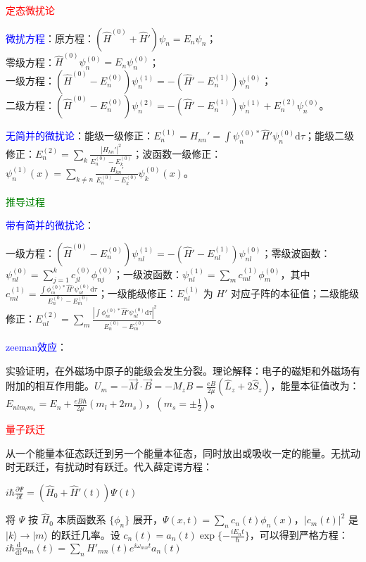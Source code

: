 \documentclass[a4paper,8pt]{extarticle} %
\newcommand{\bluetext}[1]{\textcolor{blue}{#1}}
\newcommand{\redtext}[1]{\textcolor{red}{#1}}
\newcommand{\greentext}[1]{\textcolor{green}{#1}}
\begin{document}
\begin{multicols}{3}

\redtext{定态微扰论}

\bluetext{微扰方程}：原方程：$(\hat{H}^{(0)} + \hat{H}')\psi_n = E_n\psi_n$；\\
零级方程：$\hat{H}^{(0)}\psi_n^{(0)} = E_n\psi_n^{(0)}$；\\
一级方程：$(\hat{H}^{(0)} - E_n^{(0)})\psi_n^{(1)} = -(\hat{H}' - E_n^{(1)})\psi_n^{(0)}$；\\
二级方程：$(\hat{H}^{(0)} - E_n^{(0)})\psi_n^{(2)} = -(\hat{H}' - E_n^{(1)})\psi_n^{(1)} + E_n^{(2)}\psi_n^{(0)}$。

\bluetext{无简并的微扰论}：能级一级修正：$E_n^{(1)} = H_{nn}' = \int \psi_n^{(0)*} \hat{H}'\psi_n^{(0)} \mathrm{d}\tau$；能级二级修正：$E_n^{(2)} = \sum_k \frac{|H_{kn}'|^2}{E_n^{(0)}-E_k^{(0)}}$；波函数一级修正：$\psi_n^{(1)}(x) = \sum_{k\neq n} \frac{H_{kn}'}{E_n^{(0)}-E_k^{(0)}} \psi_k^{(0)}(x)$。

\greentext{推导过程}

\bluetext{带有简并的微扰论}：

一级方程：$(\hat{H}^{(0)} - E_n^{(0)})\psi_{nl}^{(1)} = -(\hat{H}' - E_{nl}^{(1)})\psi_{nl}^{(0)}$；零级波函数：$\psi_{nl}^{(0)} = \sum_{j=1}^k c_{jl}^{(0)} \phi_{nj}^{(0)}$；一级波函数：$\psi_{nl}^{(1)} = \sum_m c_{ml}^{(1)}\phi_m^{(0)}$，其中 $c_{ml}^{(1)} = \frac{\int \phi_m^{(0)*} \hat{H}' \psi_{nl}^{(0)} \mathrm{d}\tau}{E_n^{(0)}-E_m^{(0)}}$；一级能级修正：$E_{nl}^{(1)}$ 为 $H'$ 对应子阵的本征值；二级能级修正：$E_{nl}^{(2)} = \sum_m \frac{|\int \phi_m^{(0)*} \hat{H}' \psi_{nl}^{(0)} \mathrm{d}\tau|^2}{E_n^{(0)}-E_m^{(0)}}$。

\bluetext{zeeman效应}：

实验证明，在外磁场中原子的能级会发生分裂。理论解释：电子的磁矩和外磁场有附加的相互作用能。$U_m = -\vec{M}\cdot\vec{B} = -M_z B = \frac{eB}{2\mu}(\hat{L}_z + 2\hat{S}_z)$，能量本征值改为：$E_{nlm_l m_s} = E_n + \frac{eB\hbar}{2\mu}(m_l + 2m_s)$，$(m_s = \pm\frac{1}{2})$。

\redtext{量子跃迁}

从一个能量本征态跃迁到另一个能量本征态，同时放出或吸收一定的能量。无扰动时无跃迁，有扰动时有跃迁。代入薛定谔方程：

$i\hbar\frac{\partial\Psi}{\partial t} = (\hat{H}_0 + \hat{H}'(t))\Psi(t)$

将 $\Psi$ 按 $\hat{H}_0$ 本质函数系 $\{\phi_n\}$ 展开，$\Psi(x,t) = \sum_n c_n(t)\phi_n(x)$，$|c_m(t)|^2$ 是 $|k\rangle \to |m\rangle$ 的跃迁几率。设 $c_n(t) = a_n(t)\exp\{-\frac{iE_n t}{\hbar}\}$，可以得到严格方程：
$i\hbar\frac{\mathrm{d}}{\mathrm{d}t}a_m(t) = \sum_n H'_{mn}(t)e^{i\omega_{mn}t}a_n(t)$


\end{multicols}
\end{document}
